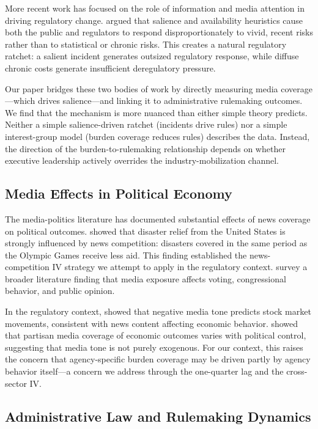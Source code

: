 \documentclass[12pt]{article}
\begin{document}
More recent work has focused on the role of information and media attention in driving regulatory change. \citet{sunstein2002risk} argued that salience and availability heuristics cause both the public and regulators to respond disproportionately to vivid, recent risks rather than to statistical or chronic risks. This creates a natural regulatory ratchet: a salient incident generates outsized regulatory response, while diffuse chronic costs generate insufficient deregulatory pressure.

Our paper bridges these two bodies of work by directly measuring media coverage---which drives salience---and linking it to administrative rulemaking outcomes. We find that the mechanism is more nuanced than either simple theory predicts. Neither a simple salience-driven ratchet (incidents drive rules) nor a simple interest-group model (burden coverage reduces rules) describes the data. Instead, the direction of the burden-to-rulemaking relationship depends on whether executive leadership actively overrides the industry-mobilization channel.

\subsection{Media Effects in Political Economy}

The media-politics literature has documented substantial effects of news coverage on political outcomes. \citet{eisensee2007news} showed that disaster relief from the United States is strongly influenced by news competition: disasters covered in the same period as the Olympic Games receive less aid. This finding established the news-competition IV strategy we attempt to apply in the regulatory context. \citet{gentzkow2015media} survey a broader literature finding that media exposure affects voting, congressional behavior, and public opinion.

In the regulatory context, \citet{tetlock2007giving} showed that negative media tone predicts stock market movements, consistent with news content affecting economic behavior. \citet{durante2011partisanship} showed that partisan media coverage of economic outcomes varies with political control, suggesting that media tone is not purely exogenous. For our context, this raises the concern that agency-specific burden coverage may be driven partly by agency behavior itself---a concern we address through the one-quarter lag and the cross-sector IV.

\subsection{Administrative Law and Rulemaking Dynamics}
\end{document}
